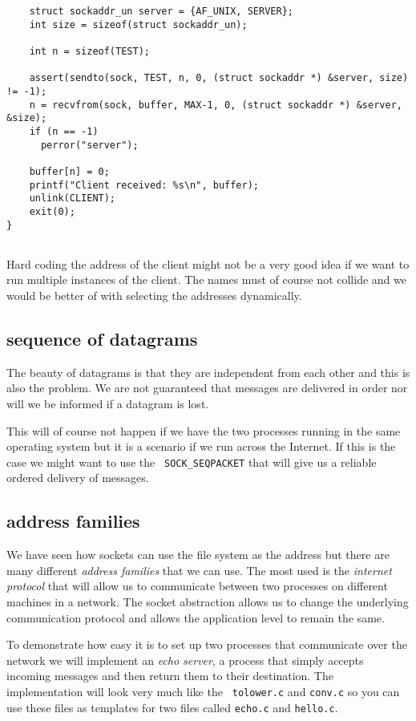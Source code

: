 \documentclass[a4paper,11pt]{article}
\begin{document}
\begin{lstlisting}
    struct sockaddr_un server = {AF_UNIX, SERVER};
    int size = sizeof(struct sockaddr_un);
    
    int n = sizeof(TEST);

    assert(sendto(sock, TEST, n, 0, (struct sockaddr *) &server, size) != -1);
    n = recvfrom(sock, buffer, MAX-1, 0, (struct sockaddr *) &server, &size);
    if (n == -1)
      perror("server");

    buffer[n] = 0;
    printf("Client received: %s\n", buffer);
    unlink(CLIENT);
    exit(0);
}
  
\end{lstlisting}

Hard coding the address of the client might not be a very good idea if
we want to run multiple instances of the client. The names must of
course not collide and we would be better of with selecting the
addresses dynamically. 

\subsection{sequence of datagrams}

The beauty of datagrams is that they are independent from each other
and this is also the problem. We are not guaranteed that messages are
delivered in order nor will we be informed if a datagram is lost.

This will of course not happen if we have the two processes running in
the same operating system but it is a scenario if we run across the
Internet. If this is the case we might want to use the {\tt
  SOCK\_SEQPACKET} that will give us a reliable ordered delivery of
messages. 

\subsection{address families}

We have seen how sockets can use the file system as the address but
there are many different {\em address families} that we can use. The
most used is the {\em internet protocol} that will allow us to
communicate between two processes on different machines in a
network. The socket abstraction allows us to change the underlying
communication protocol and allows the application level to remain the
same. 


To demonstrate how easy it is to set up two processes that communicate
over the network we will implement an {\em echo server}, a process that
simply accepts incoming messages and then return them to their
destination. The implementation will look very much like the {\tt
  tolower.c} and {\tt conv.c} so you can use these files as templates
for two files called {\tt echo.c} and {\tt hello.c}.
\end{document}
